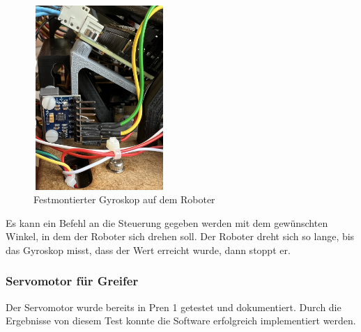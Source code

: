\begin{figure}[H]
\centering
\includegraphics[width=5cm, height=7cm]{assets/ET/Gyroskop/Gyro_Montiert.jpeg}
\caption{Festmontierter Gyroskop auf dem Roboter}
\label{fig:Gyroskop auf dem Roboter}
\end{figure}

Es kann ein Befehl an die Steuerung gegeben werden mit dem gewünschten Winkel, in dem der Roboter sich drehen soll. Der Roboter dreht sich so lange, bis das Gyroskop misst, dass der Wert erreicht wurde, dann stoppt er.


\subsubsection{Servomotor für Greifer} 

Der Servomotor wurde bereits in Pren 1 getestet und dokumentiert. Durch die Ergebnisse von diesem Test konnte die Software erfolgreich implementiert werden.

